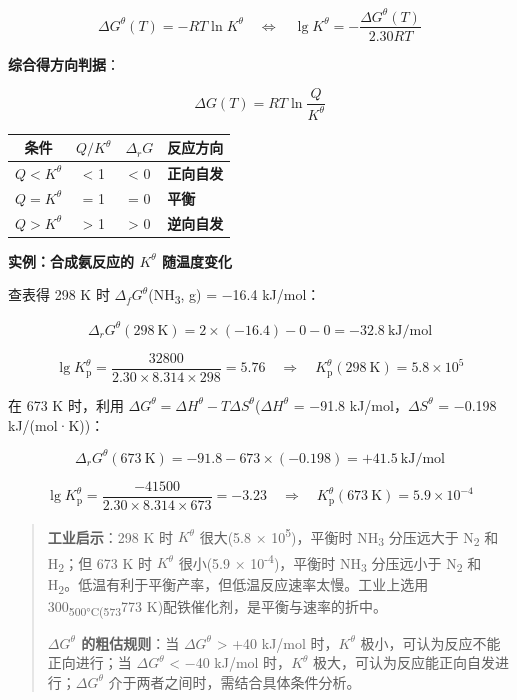 \[
\boxed{\Delta G^\theta(T) = -RT\ln K^\theta \quad \Longleftrightarrow \quad \lg K^\theta = -\frac{\Delta G^\theta(T)}{2.30RT}}
\]

\textbf{综合得方向判据}：

\[
\Delta G(T) = RT\ln\frac{Q}{K^\theta}
\]

{\def\LTcaptype{none} %
\begin{longtable}[]{@{}cccl@{}}
\toprule\noalign{}
条件 & \(Q/K^\theta\) & \(\Delta_rG\) & 反应方向 \\
\midrule\noalign{}
\endhead
\bottomrule\noalign{}
\endlastfoot
\(Q < K^\theta\) & \textless{} 1 & \textless{} 0 & \textbf{正向自发} \\
\(Q = K^\theta\) & = 1 & = 0 & \textbf{平衡} \\
\(Q > K^\theta\) & \textgreater{} 1 & \textgreater{} 0 & \textbf{逆向自发} \\
\end{longtable}
}

\textbf{实例：合成氨反应的 \(K^\theta\) 随温度变化}

查表得 298 K 时 \(\Delta_f G^\theta\)(NH\textsubscript{3}, g) = −16.4 kJ/mol：

\[
\Delta_r G^\theta(298\ \mathrm{K}) = 2 \times (-16.4) - 0 - 0 = -32.8\ \mathrm{kJ/mol}
\]

\[
\lg K_{\mathrm p}^\theta = \frac{32800}{2.30 \times 8.314 \times 298} = 5.76 \quad \Rightarrow \quad K_{\mathrm p}^\theta(298\ \mathrm{K}) = 5.8 \times 10^5
\]

在 673 K 时，利用 \(\Delta G^\theta = \Delta H^\theta - T\Delta S^\theta\)(\(\Delta H^\theta\) = −91.8 kJ/mol，\(\Delta S^\theta\) = −0.198 kJ/(mol·K))：

\[
\Delta_r G^\theta(673\ \mathrm{K}) = -91.8 - 673 \times (-0.198) = +41.5\ \mathrm{kJ/mol}
\]

\[
\lg K_{\mathrm p}^\theta = \frac{-41500}{2.30 \times 8.314 \times 673} = -3.23 \quad \Rightarrow \quad K_{\mathrm p}^\theta(673\ \mathrm{K}) = 5.9 \times 10^{-4}
\]

\begin{quote}
\textbf{工业启示}：298 K 时 \(K^\theta\) 很大(5.8 × 10\textsuperscript{5})，平衡时 NH\textsubscript{3} 分压远大于 N\textsubscript{2} 和 H\textsubscript{2}；但 673 K 时 \(K^\theta\) 很小(5.9 × 10\textsuperscript{-4})，平衡时 NH\textsubscript{3} 分压远小于 N\textsubscript{2} 和 H\textsubscript{2}。低温有利于平衡产率，但低温反应速率太慢。工业上选用 300\textsubscript{500°C(573}773 K)配铁催化剂，是平衡与速率的折中。

\textbf{\(\Delta G^\theta\) 的粗估规则}：当 \(\Delta G^\theta\) \textgreater{} +40 kJ/mol 时，\(K^\theta\) 极小，可认为反应不能正向进行；当 \(\Delta G^\theta\) \textless{} −40 kJ/mol 时，\(K^\theta\) 极大，可认为反应能正向自发进行；\(\Delta G^\theta\) 介于两者之间时，需结合具体条件分析。
\end{quote}

